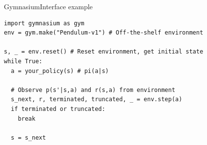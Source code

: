 \documentclass[aspectratio=1609,ADDITIONAL_DOCCLASS_ARGS]{beamer}
\begin{document}
\begin{frame}[fragile]{Gymnasium}{Interface example}
\begin{verbatim}
import gymnasium as gym
env = gym.make("Pendulum-v1") # Off-the-shelf environment

s, _ = env.reset() # Reset environment, get initial state
while True:
  a = your_policy(s) # pi(a|s)

  # Observe p(s'|s,a) and r(s,a) from environment
  s_next, r, terminated, truncated, _ = env.step(a)
  if terminated or truncated:
    break

  s = s_next
\end{verbatim}
\end{frame}
\end{document}
